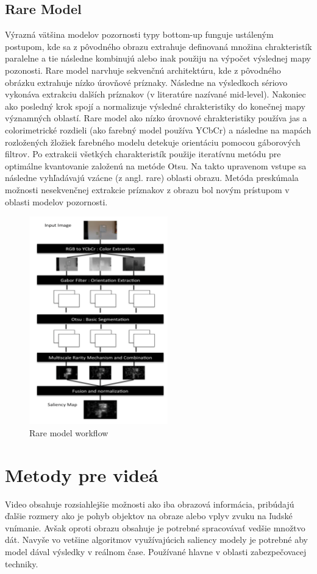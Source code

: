 \subsection{Rare Model}
Výrazná vätšina modelov pozornosti typy bottom-up funguje ustáleným postupom, kde sa z pôvodného obrazu extrahuje definovaná množina chrakteristík paralelne a tie následne kombinujú alebo inak použiju na výpočet výslednej mapy pozonosti.
Rare model narvhuje sekvenčnú architektúru, kde z pôvodného obrázku extrahuje nízko úrovňové príznaky.
Následne na výsledkoch sériovo vykonáva extrakciu dalších príznakov (v literatúre nazívané mid-level).
Nakoniec ako posledný krok spojí a normalizuje výsledné chrakteristiky do konečnej mapy významných oblastí.
Rare model ako nízko úrovnové chrakteristiky používa jas a colorimetrické rozdieli (ako farebný model používa YCbCr) a následne na mapách rozložených žložiek farebného modelu detekuje orientáciu pomocou gáborových filtrov\cite{rare-1}.
Po extrakcii všetkých charakteristík použije iteratívnu metódu pre optimálne kvantovanie založenú na metóde Otsu\cite{otsu}.
Na takto upravenom vstupe sa následne vyhľadávajú vzácne (z angl. rare) oblasti obrazu.
Metóda preskúmala možnosti nesekvenčnej extrakcie príznakov z obrazu bol novým prístupom v oblasti modelov pozornosti.

\begin{figure}[H]
  \centering
  \includegraphics[width=6cm]{pics/rare-1.png}
  \caption{Rare model workflow}\label{wrap-fig:3}
\end{figure}

\section{Metody pre videá}
Video obsahuje rozsiahlejšie možnosti ako iba obrazová informácia, pribúdajú ďalšie rozmery ako je pohyb objektov na obraze alebo vplyv zvuku na ľudské vnímanie.
Avšak oproti obrazu obsahuje je potrebné spracovávať vedšie množtvo
dát.
Navyše vo vetšine algoritmov využívajúcich saliency modely je potrebné aby model dával výsledky v reálnom čase.
Používané hlavne v oblasti zabezpečovacej techniky.
